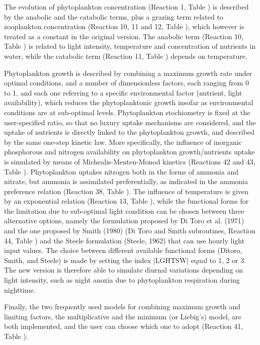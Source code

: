 The evolution of phytoplankton concentration (Reaction 1, 
Table \Tone)
is described by the anabolic and the catabolic terms, plus 
a grazing term related to zooplankton concentration (Reaction 
10, 11 and 12, Table \Ttwoa), which however is treated as a constant
in the original version. 
The anabolic term (Reaction 10, Table \Ttwoa) is related to light 
intensity, temperature and concentration of nutrients in water, 
while the catabolic term (Reaction 11, Table \Ttwoa) depends on temperature.

Phytoplankton growth is described by combining a maximum growth 
rate under optimal conditions, and a number of dimensionless 
factors, each ranging from 0 to 1, and each one referring to 
a specific environmental factor (nutrient, light availability), 
which reduces the phytoplanktonic growth insofar as environmental 
conditions are at sub-optimal levels. Phytoplankton stochiometry 
is fixed at the user-specified ratio, so that no luxury uptake 
mechanisms are considered, and the uptake of nutrients is directly 
linked to the phytoplankton growth, and described by the same 
one-step kinetic law. More specifically, the influence of inorganic 
phosphorous and nitrogen availability on phytoplankton growth/nutrients 
uptake is simulated by means of Michealis-Menten-Monod kinetics 
(Reactions 42 and 43, Table \Ttwoa). Phytoplankton uptakes nitrogen 
both in the forms of ammonia and nitrate, but ammonia is assimilated 
preferentially, as indicated in the ammonia preference relation 
(Reaction 38, Table \Ttwoa). The influence of temperature is given 
by an exponential relation (Reaction 13, Table \Ttwoa), while the 
functional forms for the limitation due to sub-optimal light 
condition can be chosen between three alternative options, namely 
the formulation proposed by Di Toro et al. (1971) and the one 
proposed by Smith (1980) (Di Toro and Smith subroutines, Reaction 
44, Table \Ttwoa) and the Steele formulation (Steele, 1962) that 
can use hourly light input values. The 
choice between different available functional forms (Ditoro, 
Smith, and Steele) is made by setting the index |LGHTSW| equal 
to 1, 2 or 3. The new version is therefore able to simulate diurnal 
variations depending on light intensity, such as night anoxia 
due to phytoplankton respiration during nighttime.

Finally, the two frequently used models for combining maximum 
growth and limiting factors, the multiplicative and the minimum 
(or Liebig's) model, are both implemented, and the user can choose 
which one to adopt (Reaction 41, Table \Ttwoa).

